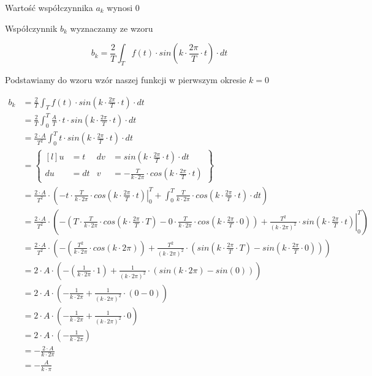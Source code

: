 Wartość współczynnika $a_k$ wynosi $0$


Współczynnik $b_k$ wyznaczamy ze wzoru

\begin{equation}
b_k=\frac{2}{T}\int_{T}f(t) \cdot sin\left( k \cdot \frac{2\pi}{T} \cdot t\right) \cdot dt
\end{equation}

Podstawiamy do wzoru wzór naszej funkcji w pierwszym okresie $k=0$

\begin{equation}
\begin{aligned}
b_k&=\frac{2}{T}\int_{T}f(t) \cdot sin\left( k \cdot \frac{2\pi}{T} \cdot t\right) \cdot dt\\
&=\frac{2}{T}\int_{0}^{T}\frac{A}{T}\cdot t \cdot sin\left( k \cdot \frac{2\pi}{T} \cdot t\right) \cdot dt\\
&=\frac{2\cdot A}{T^2}\int_{0}^{T} t \cdot sin\left( k \cdot \frac{2\pi}{T} \cdot t\right) \cdot dt\\
&=\begin{Bmatrix*}[l]
u&=t & dv&=sin\left( k \cdot \frac{2\pi}{T} \cdot t\right) \cdot dt \\
du&=dt & v&=-\frac{T}{k\cdot 2\pi}\cdot cos\left( k \cdot \frac{2\pi}{T} \cdot t\right)
\end{Bmatrix*}\\
&=\frac{2\cdot A}{T^2}\cdot \left(- \left.t \cdot \frac{T}{k\cdot 2\pi}\cdot cos\left( k \cdot \frac{2\pi}{T} \cdot t\right)\right|_{0}^{T} + \int_{0}^{T} \frac{T}{k\cdot 2\pi}\cdot cos\left( k \cdot \frac{2\pi}{T} \cdot t\right) \cdot dt \right)\\
&=\frac{2\cdot A}{T^2}\cdot \left(- \left(T \cdot \frac{T}{k\cdot 2\pi}\cdot cos\left( k \cdot \frac{2\pi}{T} \cdot T\right) - 0 \cdot \frac{T}{k\cdot 2\pi}\cdot cos\left( k \cdot \frac{2\pi}{T} \cdot 0\right)\right) + \left. \frac{T^2}{\left(k\cdot 2\pi\right)^2}\cdot sin\left( k \cdot \frac{2\pi}{T} \cdot t\right) \right|_{0}^{T} \right)\\
&=\frac{2\cdot A}{T^2}\cdot \left(- \left(\frac{T^2}{k\cdot 2\pi}\cdot cos\left( k \cdot 2\pi\right) \right) + \frac{T^2}{\left(k\cdot 2\pi\right)^2}\cdot \left(sin\left( k \cdot \frac{2\pi}{T} \cdot T\right) - sin\left( k \cdot \frac{2\pi}{T} \cdot 0\right)\right) \right)\\
&=2\cdot A \cdot \left(- \left(\frac{1}{k\cdot 2\pi}\cdot 1 \right) + \frac{1}{\left(k\cdot 2\pi\right)^2}\cdot \left(sin\left( k \cdot 2\pi\right) - sin\left( 0\right)\right) \right)\\
&=2\cdot A \cdot \left(- \frac{1}{k\cdot 2\pi} + \frac{1}{\left(k\cdot 2\pi\right)^2}\cdot \left(0 - 0\right) \right)\\
&=2\cdot A \cdot \left(- \frac{1}{k\cdot 2\pi} + \frac{1}{\left(k\cdot 2\pi\right)^2}\cdot 0 \right)\\
&=2\cdot A \cdot \left(- \frac{1}{k\cdot 2\pi}\right)\\
&=-\frac{2 \cdot A}{k\cdot 2\pi}\\
&=-\frac{A}{k\cdot \pi}\\
\end{aligned}
\end{equation}


